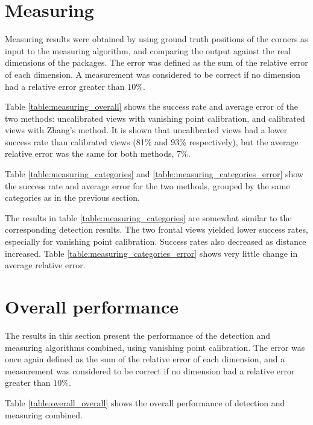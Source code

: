 \section{Measuring} \label{results:measuring} 
Measuring results were obtained by using ground truth positions of the corners as input to the measuring algorithm, and comparing the output against the real dimensions of the packages.
The error was defined as the sum of the relative error of each dimension.
A measurement was considered to be correct if no dimension had a relative error greater than $10\%$.

Table \ref{table:measuring_overall} shows the success rate and average error of the two methods: uncalibrated views with vanishing point calibration, and calibrated views with Zhang's method.
It is shown that uncalibrated views had a lower success rate than calibrated views (81\% and 93\% respectively), but the average relative error was the same for both methods, 7\%.



Table \ref{table:measuring_categories} and \ref{table:measuring_categories_error} show the success rate and average error for the two methods, grouped by the same categories as in the previous section.





The results in table \ref{table:measuring_categories} are somewhat similar to the corresponding detection results.
The two frontal views yielded lower success rates, especially for vanishing point calibration.
Success rates also decreased as distance increased.
Table \ref{table:measuring_categories_error} shows very little change in average relative error.

\section{Overall performance} \label{results:overall}
The results in this section present the performance of the detection and measuring algorithms combined, using vanishing point calibration.
The error was once again defined as the sum of the relative error of each dimension, and
a measurement was considered to be correct if no dimension had a relative error greater than $10\%$.

Table \ref{table:overall_overall} shows the overall performance of detection and measuring combined.

